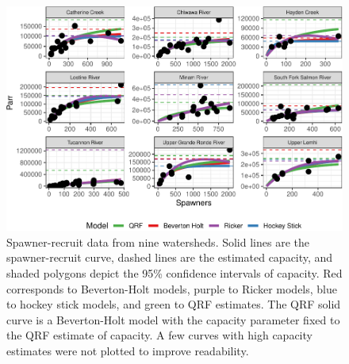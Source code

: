 \documentclass[
  12pt,
]{article}
\begin{document}
\newpage

\begin{figure}
\centering
\includegraphics{../figures/sr-figure-1.pdf}
\caption{\label{fig:sr-figure}Spawner-recruit data from nine watersheds. Solid lines are the spawner-recruit curve, dashed lines are the estimated capacity, and shaded polygons depict the 95\% confidence intervals of capacity. Red corresponds to Beverton-Holt models, purple to Ricker models, blue to hockey stick models, and green to QRF estimates. The QRF solid curve is a Beverton-Holt model with the capacity parameter fixed to the QRF estimate of capacity. A few curves with high capacity estimates were not plotted to improve readability.}
\end{figure}
\end{document}
